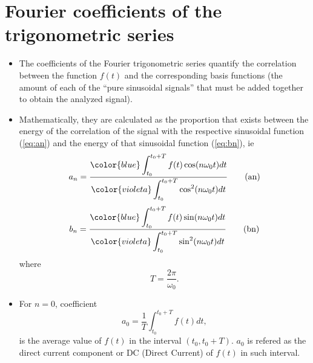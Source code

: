 \section{Fourier coefficients of the trigonometric series}
\begin{itemize}
\item The coefficients of the Fourier trigonometric series quantify
  the correlation between the function $f(t)$ and the corresponding
  basis functions (the amount of each of the ``pure sinusoidal
  signals'' that must be added together to obtain the analyzed
  signal).
\item Mathematically, they are calculated as the proportion that
  exists between the energy of the correlation of the signal with the
  respective sinusoidal function (\ref{eq:an}) and the energy of that
  sinusoidal function (\ref{eq:bn}), ie
  \begin{equation}
    a_n=\frac{\displaystyle
      {\color{blue} \int_{t_0}^{t_0+T}f(t)\cos(n\omega_0t)dt}
    }{\displaystyle
      {\color{violeta} \int_{t_0}^{t_0+T}\cos^2(n\omega_0t)dt}
    } \tag{an}
    \label{eq:an}
  \end{equation}
  \begin{equation}
    b_n=\frac{\displaystyle
      {\color{blue} \int_{t_0}^{t_0+T}f(t)\sin(n\omega_0t)dt}
    }{\displaystyle
      {\color{violeta} \int_{t_0}^{t_0+T}\sin^2(n\omega_0t)dt}
    } \label{eq:bn} \tag{bn}
  \end{equation}
  where
  \begin{equation*}
  T=\frac{2\pi}{\omega_0}.
  \end{equation*}
\item For $n=0$, coefficient
  \begin{equation*}
    a_0 = \frac{1}{T}\int_{t_0}^{t_0+T} f(t)dt,
  \end{equation*}
  is the average value of $f(t)$ in the interval $(t_0, t_0+T)$. $a_0$
  is refered as the direct current component or DC (Direct Current) of
  $f(t)$ in such interval.


\end{itemize}
